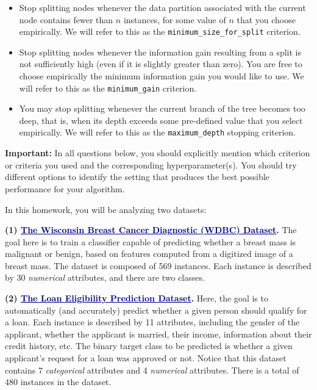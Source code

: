 \documentclass{article}
\begin{document}
\begin{itemize} 
\item Stop splitting nodes whenever the data partition associated with the current node contains fewer than $n$ instances, for some value of $n$ that you choose empirically. We will refer to this as the \texttt{minimum\_size\_for\_split} criterion.
\item Stop splitting nodes whenever the information gain resulting from a split is not sufficiently high (even if it is slightly greater than zero). You are free to choose empirically the minimum information gain you would like to use. We will refer to this as the \texttt{minimum\_gain} criterion.
\item You may stop splitting whenever the current branch of the tree becomes too deep, that is, when its depth exceeds some pre-defined value that you select empirically. We will refer to this as the \texttt{maximum\_depth} stopping criterion.
\end{itemize}
%
\begin{mybox}[boxpink] 
\textbf{Important:} In all questions below, you should explicitly mention which criterion or criteria you used and the corresponding hyperparameter(s). You should try different options to identify the setting that produces the best possible performance for your algorithm.
\end{mybox}
%





\noindent In this homework, you will be analyzing two datasets:
\vspace{0.3cm}

\noindent \textbf{(1) \textcolor{darkblue}{\ul{The Wisconsin Breast Cancer Diagnostic (WDBC) Dataset}}.}
\noindent The goal here is to train a classifier capable of predicting whether a breast mass is malignant or benign, based on features computed from a digitized image of a breast mass. The dataset is composed of 569 instances. Each instance is described by 30 \textit{numerical} attributes, and there are two classes.
\vspace{0.5cm}

\noindent \textbf{(2) \textcolor{darkblue}{\ul{The Loan Eligibility Prediction Dataset}}.}
\noindent Here, the goal is to automatically (and accurately) predict whether a given person should qualify for a loan. Each instance is described by 11 attributes, including the gender of the applicant, whether the applicant is married, their income, information about their credit history, etc. The binary target class to be predicted is whether a given applicant's request for a loan was approved or not. Notice that this dataset contains 7 \textit{categorical} attributes and 4 \textit{numerical} attributes. There is a total of 480 instances in the dataset. 
\vspace{0.3cm}
\end{document}

